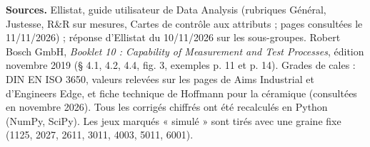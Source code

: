 \documentclass[10pt,a4paper]{article}
\begin{document}
\vspace{6pt}
{\footnotesize\color{uimm}\textbf{Sources.} Ellistat, guide utilisateur de Data Analysis (rubriques Général, Justesse, R\&R sur mesures, Cartes de contrôle aux attributs ; pages consultées le 11/11/2026) ; réponse d'Ellistat du 10/11/2026 sur les sous-groupes. Robert Bosch GmbH, \emph{Booklet 10 : Capability of Measurement and Test Processes}, édition novembre 2019 (§ 4.1, 4.2, 4.4, fig. 3, exemples p. 11 et p. 14). Grades de cales : DIN EN ISO 3650, valeurs relevées sur les pages de Aims Industrial et d'Engineers Edge, et fiche technique de Hoffmann pour la céramique (consultées en novembre 2026). Tous les corrigés chiffrés ont été recalculés en Python (NumPy, SciPy). Les jeux marqués « simulé » sont tirés avec une graine fixe (1125, 2027, 2611, 3011, 4003, 5011, 6001).}
\end{document}

